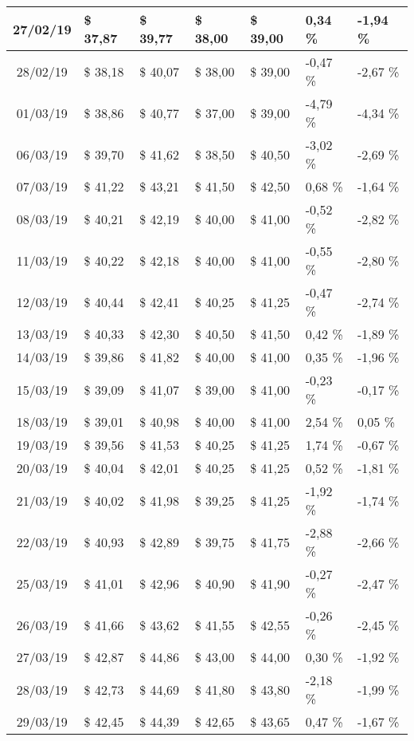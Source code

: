 \begin{center}
\begin{longtable}{|c|p{1.5cm}|p{1.5cm}|p{1.5cm}|p{1.5cm}|p{1.5cm}|p{1.5cm}|}
27/02/19 & \$ 37,87 & \$ 39,77 & \$ 38,00 & \$ 39,00 & 0,34 \% & -1,94 \% \\ \hline
28/02/19 & \$ 38,18 & \$ 40,07 & \$ 38,00 & \$ 39,00 & -0,47 \% & -2,67 \% \\ \hline
01/03/19 & \$ 38,86 & \$ 40,77 & \$ 37,00 & \$ 39,00 & -4,79 \% & -4,34 \% \\ \hline
06/03/19 & \$ 39,70 & \$ 41,62 & \$ 38,50 & \$ 40,50 & -3,02 \% & -2,69 \% \\ \hline
07/03/19 & \$ 41,22 & \$ 43,21 & \$ 41,50 & \$ 42,50 & 0,68 \% & -1,64 \% \\ \hline
08/03/19 & \$ 40,21 & \$ 42,19 & \$ 40,00 & \$ 41,00 & -0,52 \% & -2,82 \% \\ \hline
11/03/19 & \$ 40,22 & \$ 42,18 & \$ 40,00 & \$ 41,00 & -0,55 \% & -2,80 \% \\ \hline
12/03/19 & \$ 40,44 & \$ 42,41 & \$ 40,25 & \$ 41,25 & -0,47 \% & -2,74 \% \\ \hline
13/03/19 & \$ 40,33 & \$ 42,30 & \$ 40,50 & \$ 41,50 & 0,42 \% & -1,89 \% \\ \hline
14/03/19 & \$ 39,86 & \$ 41,82 & \$ 40,00 & \$ 41,00 & 0,35 \% & -1,96 \% \\ \hline
15/03/19 & \$ 39,09 & \$ 41,07 & \$ 39,00 & \$ 41,00 & -0,23 \% & -0,17 \% \\ \hline
18/03/19 & \$ 39,01 & \$ 40,98 & \$ 40,00 & \$ 41,00 & 2,54 \% & 0,05 \% \\ \hline
19/03/19 & \$ 39,56 & \$ 41,53 & \$ 40,25 & \$ 41,25 & 1,74 \% & -0,67 \% \\ \hline
20/03/19 & \$ 40,04 & \$ 42,01 & \$ 40,25 & \$ 41,25 & 0,52 \% & -1,81 \% \\ \hline
21/03/19 & \$ 40,02 & \$ 41,98 & \$ 39,25 & \$ 41,25 & -1,92 \% & -1,74 \% \\ \hline
22/03/19 & \$ 40,93 & \$ 42,89 & \$ 39,75 & \$ 41,75 & -2,88 \% & -2,66 \% \\ \hline
25/03/19 & \$ 41,01 & \$ 42,96 & \$ 40,90 & \$ 41,90 & -0,27 \% & -2,47 \% \\ \hline
26/03/19 & \$ 41,66 & \$ 43,62 & \$ 41,55 & \$ 42,55 & -0,26 \% & -2,45 \% \\ \hline
27/03/19 & \$ 42,87 & \$ 44,86 & \$ 43,00 & \$ 44,00 & 0,30 \% & -1,92 \% \\ \hline
28/03/19 & \$ 42,73 & \$ 44,69 & \$ 41,80 & \$ 43,80 & -2,18 \% & -1,99 \% \\ \hline
29/03/19 & \$ 42,45 & \$ 44,39 & \$ 42,65 & \$ 43,65 & 0,47 \% & -1,67 \% \\ \hline

\end{longtable}
\end{center}
